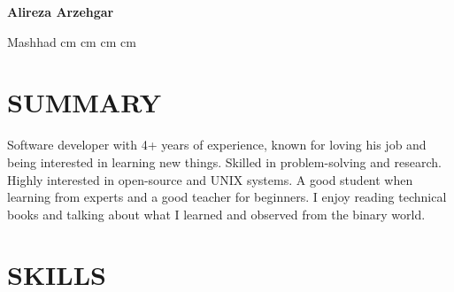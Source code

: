 \documentclass{engineercv}
\begin{document}
\begin{center}
  \textbf{\fontsize{24 pt}{24 pt}\selectfont Alireza Arzehgar}

  \vspace{0.3 cm}

  \normalsize
  \mbox{{\color{black}\footnotesize\faMapMarker*}\hspace*{0.13cm}Mashhad}
   cm
  \mbox{}
   cm
  \mbox{}
   cm
  \mbox{}
   cm
  \mbox{}
\end{center}

\vspace{0.3 cm - 0.3 cm}

\section{SUMMARY}

Software developer with 4+ years of experience, known for loving his job and being interested in learning new things.
Skilled in problem-solving and research. Highly interested in open-source and UNIX systems.
A good student when learning from experts and a good teacher for beginners.
I enjoy reading technical books and talking about what I learned and observed from the binary world.

\section{SKILLS}
\end{document}
